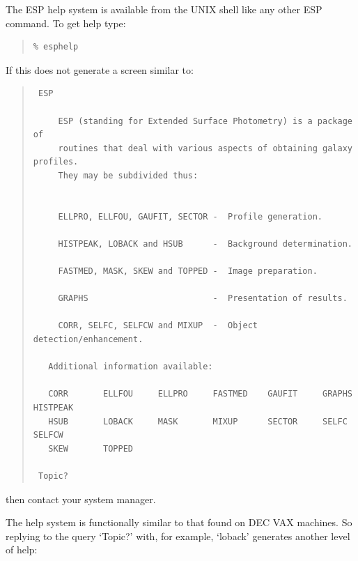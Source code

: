 \documentclass[twoside,11pt]{article}
\newenvironment{myquote}{\begin{quote}\begin{small}}{\end{small}\end{quote}}
\begin{document}
The ESP help system is available from the UNIX shell like any other ESP
command. To get help type:
 
\begin{myquote}
\begin{verbatim}
% esphelp
\end{verbatim}
\end{myquote}

If this does not generate a screen similar to:

\begin{myquote}
\begin{verbatim}    
 ESP
 
     ESP (standing for Extended Surface Photometry) is a package of
     routines that deal with various aspects of obtaining galaxy profiles.
     They may be subdivided thus:
 
 
     ELLPRO, ELLFOU, GAUFIT, SECTOR -  Profile generation.
 
     HISTPEAK, LOBACK and HSUB      -  Background determination.
 
     FASTMED, MASK, SKEW and TOPPED -  Image preparation.
 
     GRAPHS                         -  Presentation of results.
 
     CORR, SELFC, SELFCW and MIXUP  -  Object detection/enhancement.
 
   Additional information available:
 
   CORR       ELLFOU     ELLPRO     FASTMED    GAUFIT     GRAPHS     HISTPEAK   
   HSUB       LOBACK     MASK       MIXUP      SECTOR     SELFC      SELFCW     
   SKEW       TOPPED
 
 Topic? 
 \end{verbatim}
\end{myquote}

then contact your system manager.

The help system is functionally  similar to that found on DEC VAX machines.
So replying to the query `Topic?' with, for example, `loback' generates 
another level of help:
\end{document}
